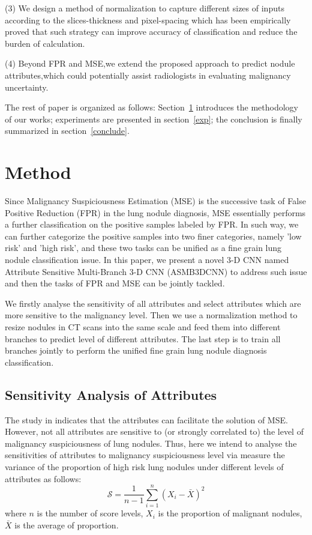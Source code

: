 \documentclass[runningheads]{llncs}
\begin{document}
(3) We design a method of normalization to capture different sizes of inputs according to the slices-thickness and pixel-spacing which has been empirically proved that such strategy can improve accuracy of classification and reduce the burden of calculation.

(4) Beyond FPR and MSE,we extend the proposed approach to predict nodule attributes,which could potentially assist radiologists in evaluating malignancy uncertainty.

The rest of paper is organized as follows: Section~\ref{method} introduces the methodology of our works; experiments are presented in section~\ref{exp}; the conclusion is finally summarized in section~\ref{conclude}.



\section{Method}
\label{method}
Since Malignancy Suspiciousness Estimation (MSE) is the successive task of False Positive Reduction (FPR) in the lung nodule diagnosis, MSE essentially performs a further classification on the positive samples labeled by FPR. In such way, we can further categorize the positive samples into two finer categories, namely 'low risk' and 'high risk', and these two tasks can be unified as a fine grain lung nodule classification issue. In this paper, we present a novel 3-D CNN named  Attribute Sensitive Multi-Branch 3-D CNN (ASMB3DCNN) to address such issue and then the tasks of FPR and MSE can be jointly tackled. 

We firstly analyse the sensitivity of all attributes and select attributes which are more sensitive to the malignancy level.  Then we use a normalization method to resize nodules in CT scans into the same scale and feed them into different branches to predict level of different attributes. The last step is to train all branches jointly to perform the unified fine grain lung nodule diagnosis classification.


\subsection{Sensitivity Analysis of Attributes}
\label{select}
The study in \cite{Hussein2017Risk} indicates that the attributes can facilitate the solution of MSE. However, not all attributes are sensitive to (or strongly correlated to) the level of malignancy suspiciousness of lung nodules. Thus, here we intend to analyse the sensitivities of attributes to malignancy suspiciousness level via measure the variance of the proportion of high risk lung nodules under different levels of attributes as follows:
\begin{equation}
\mathcal{S} = \frac{1}{n-1}\sum_{i=1}^n (X_i - \bar{X})^{2}
\end{equation}
where $n$ is the number of score levels,  $X_i$ is the proportion of malignant nodules, $\bar{X}$ is the average of proportion.
\end{document}

